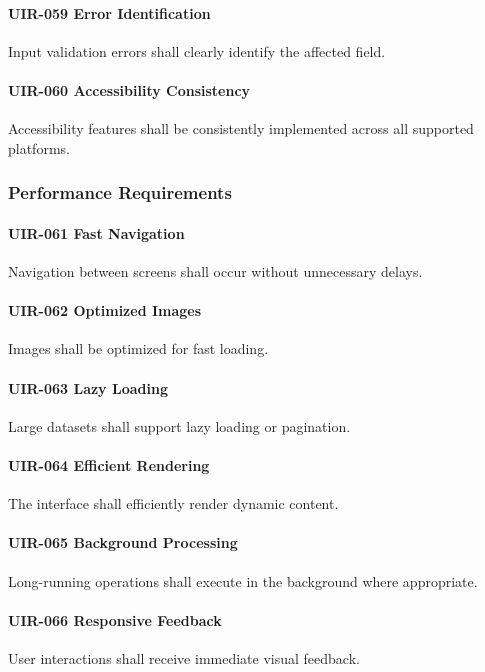 \paragraph{UIR-059 Error Identification}
Input validation errors shall clearly identify the affected field.

\paragraph{UIR-060 Accessibility Consistency}
Accessibility features shall be consistently implemented across all
supported platforms.

\subsubsection*{Performance Requirements}

\paragraph{UIR-061 Fast Navigation}
Navigation between screens shall occur without unnecessary delays.

\paragraph{UIR-062 Optimized Images}
Images shall be optimized for fast loading.

\paragraph{UIR-063 Lazy Loading}
Large datasets shall support lazy loading or pagination.

\paragraph{UIR-064 Efficient Rendering}
The interface shall efficiently render dynamic content.

\paragraph{UIR-065 Background Processing}
Long-running operations shall execute in the background where
appropriate.

\paragraph{UIR-066 Responsive Feedback}
User interactions shall receive immediate visual feedback.

